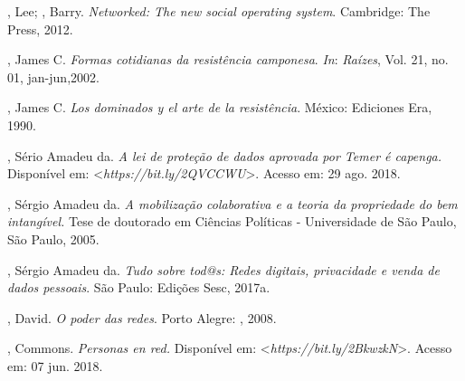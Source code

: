 \begin{Parskip}
, Lee; , Barry. \emph{Networked: The new social
operating system}. Cambridge: The  Press, 2012.

, James C. \emph{Formas cotidianas da resistência camponesa}. \emph{In}:
\emph{Raízes}, Vol. 21, no. 01, jan-jun,2002.

, James C. \emph{Los dominados y el arte de la resistência}.
México: Ediciones Era, 1990.

, Sério Amadeu da. \emph{A lei de proteção de dados aprovada
por Temer é capenga.} Disponível em: \textless{}\emph{https://bit.ly/2QVCCWU}\textgreater{}. Acesso em: 29 ago. 2018.

, Sérgio Amadeu da. \emph{A mobilização colaborativa e a
teoria da propriedade do bem intangível.} Tese de doutorado em Ciências
Políticas - Universidade de São Paulo, São Paulo, 2005.

, Sérgio Amadeu da. \emph{Tudo sobre tod@s: Redes digitais,
privacidade e venda de dados pessoais}. São Paulo: Edições Sesc, 2017a.

, David. \emph{O poder das redes}. Porto Alegre: , 2008.

, Commons. \emph{Personas en red.} Disponível em:
\textless{}\emph{https://bit.ly/2BkwzkN}\textgreater{}. Acesso em: 07 jun. 2018.
\end{Parskip}